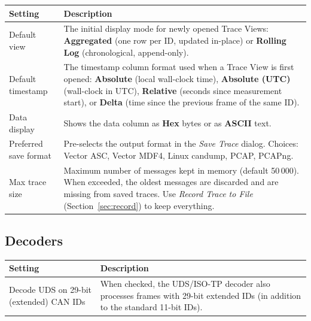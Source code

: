 \documentclass[a4paper,11pt]{article}
\newcommand{\menu}[1]{\textit{#1}}
\newcommand{\ui}[1]{\textbf{#1}}
\begin{document}
\begin{table}[h]
  \centering
  \begin{tabularx}{\textwidth}{lX}
    \toprule
    \textbf{Setting} & \textbf{Description} \\
    \midrule
    Default view
      & The initial display mode for newly opened Trace Views:
        \ui{Aggregated} (one row per ID, updated in-place) or
        \ui{Rolling Log} (chronological, append-only). \\
    Default timestamp
      & The timestamp column format used when a Trace View is first opened:
        \ui{Absolute} (local wall-clock time),
        \ui{Absolute (UTC)} (wall-clock in UTC),
        \ui{Relative} (seconds since measurement start), or
        \ui{Delta} (time since the previous frame of the same ID). \\
    Data display
      & Shows the data column as \ui{Hex} bytes or as \ui{ASCII} text. \\
    Preferred save format
      & Pre-selects the output format in the \menu{Save Trace} dialog.
        Choices: Vector ASC, Vector MDF4, Linux candump, PCAP, PCAPng. \\
    Max trace size
      & Maximum number of messages kept in memory (default 50\,000). When
        exceeded, the oldest messages are discarded and are missing from saved
        traces. Use \menu{Record Trace to File} (Section~\ref{sec:record}) to
        keep everything. \\
    \bottomrule
  \end{tabularx}
\end{table}

\subsection*{Decoders}

\begin{table}[h]
  \centering
  \begin{tabularx}{\textwidth}{lX}
    \toprule
    \textbf{Setting} & \textbf{Description} \\
    \midrule
    Decode UDS on 29-bit (extended) CAN IDs
      & When checked, the UDS/ISO-TP decoder also processes frames with
        29-bit extended IDs (in addition to the standard 11-bit IDs). \\
    \bottomrule
  \end{tabularx}
\end{table}

\end{document}
